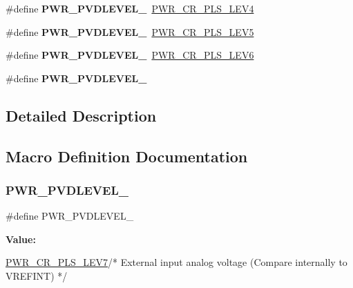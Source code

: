 \begin{DoxyCompactItemize}
\#define {\bfseries P\+W\+R\+\_\+\+P\+V\+D\+L\+E\+V\+E\+L\+\_}~\mbox{\hyperlink{group___peripheral___registers___bits___definition_ga0fe79f097ea6c30a4ccf69ed3e177f85}{P\+W\+R\+\_\+\+C\+R\+\_\+\+P\+L\+S\+\_\+\+L\+E\+V4}}
\item 
\mbox{\label{group___p_w_r___p_v_d__detection__level_ga46a1476440945c2b6426b4973172f24b}} 
\#define {\bfseries P\+W\+R\+\_\+\+P\+V\+D\+L\+E\+V\+E\+L\+\_}~\mbox{\hyperlink{group___peripheral___registers___bits___definition_ga326781d09a07b4d215424fbbae11b7b2}{P\+W\+R\+\_\+\+C\+R\+\_\+\+P\+L\+S\+\_\+\+L\+E\+V5}}
\item 
\mbox{\label{group___p_w_r___p_v_d__detection__level_ga5dda7d0ac3fd3d606666455ca3c8f537}} 
\#define {\bfseries P\+W\+R\+\_\+\+P\+V\+D\+L\+E\+V\+E\+L\+\_}~\mbox{\hyperlink{group___peripheral___registers___bits___definition_gaaff17e9c7fe7d837523b1e9a2f4e9baf}{P\+W\+R\+\_\+\+C\+R\+\_\+\+P\+L\+S\+\_\+\+L\+E\+V6}}
\item 
\#define {\bfseries P\+W\+R\+\_\+\+P\+V\+D\+L\+E\+V\+E\+L\+\_}
\end{DoxyCompactItemize}


\subsection{Detailed Description}


\subsection{Macro Definition Documentation}
\mbox{\label{group___p_w_r___p_v_d__detection__level_ga2c5cd8dd26b13bdf0164c1f7596b4bfd}} 
\subsubsection{\texorpdfstring{P\+W\+R\+\_\+\+P\+V\+D\+L\+E\+V\+E\+L\+\_}{PWR\_PVDLEVEL\_7}}
{\footnotesize\ttfamily \#define P\+W\+R\+\_\+\+P\+V\+D\+L\+E\+V\+E\+L\+\_}

{\bfseries Value\+:}
\begin{DoxyCode}
\mbox{\hyperlink{group___peripheral___registers___bits___definition_ga95e3b301b5470ae94d32c53a9fbdfc8b}{PWR\_CR\_PLS\_LEV7}}\textcolor{comment}{/* External input analog voltage }
\textcolor{comment}{                                                          (Compare internally to VREFINT) */}
\end{DoxyCode}

